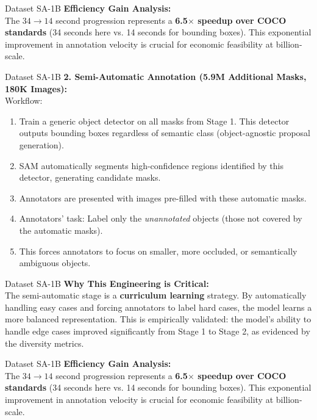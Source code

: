 \documentclass[11pt, aspectratio=169]{beamer}
\begin{document}
\begin{frame}{Dataset SA-1B}
	\textbf{Efficiency Gain Analysis:} \\
	The $34 \rightarrow 14$ second progression represents a \textbf{6.5$\times$ speedup over COCO standards} (34 seconds here vs. 14 seconds for bounding boxes). This exponential improvement in annotation velocity is crucial for economic feasibility at billion-scale.
\end{frame}

\begin{frame}{Dataset SA-1B}
	\textbf{2. Semi-Automatic Annotation (5.9M Additional Masks, 180K Images):} \\
	Workflow:
	\begin{enumerate}
		\item Train a generic object detector on all masks from Stage 1. This detector outputs bounding boxes regardless of semantic class (object-agnostic proposal generation).
		\item SAM automatically segments high-confidence regions identified by this detector, generating candidate masks.
		\item Annotators are presented with images pre-filled with these automatic masks.
		\item Annotators' task: Label only the \textit{unannotated} objects (those not covered by the automatic masks).
		\item This forces annotators to focus on smaller, more occluded, or semantically ambiguous objects.
	\end{enumerate}
\end{frame}

\begin{frame}{Dataset SA-1B}
	\textbf{Why This Engineering is Critical:} \\
	The semi-automatic stage is a \textbf{curriculum learning} strategy. By automatically handling easy cases and forcing annotators to label hard cases, the model learns a more balanced representation. This is empirically validated: the model's ability to handle edge cases improved significantly from Stage 1 to Stage 2, as evidenced by the diversity metrics.
\end{frame}

\begin{frame}{Dataset SA-1B}
	\textbf{Efficiency Gain Analysis:} \\
	The $34 \rightarrow 14$ second progression represents a \textbf{6.5$\times$ speedup over COCO standards} (34 seconds here vs. 14 seconds for bounding boxes). This exponential improvement in annotation velocity is crucial for economic feasibility at billion-scale.
\end{frame}
\end{document}
